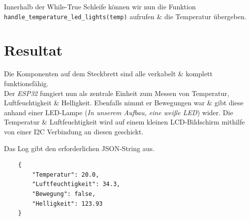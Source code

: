 \documentclass[9pt,a4paper]{report}
\begin{document}
	Innerhalb der While-True Schleife können wir nun die Funktion \\ \texttt{handle\_temperature\_led\_lights(temp)} aufrufen \& die Temperatur übergeben.
	
	
	\part{Resultat}
	Die Komponenten auf dem Steckbrett sind alle verkabelt \& komplett funktionsfähig.\\
	
	Der \textit{ESP32} fungiert nun als zentrale Einheit zum Messen von Temperatur, Luftfeuchtigkeit \& Helligkeit. Ebenfalls nimmt er Bewegungen war \& gibt diese anhand einer LED-Lampe (\textit{In unserem Aufbau, eine weiße LED}) wider. Die Temperatur \& Luftfeuchtigkeit wird auf einem kleinen LCD-Bildschirm mithilfe von einer I2C Verbindung an diesen geschickt.
	
	Das Log gibt den erforderlichen JSON-String aus.
	\begin{lstlisting}
	{
		"Temperatur": 20.0,
		"Luftfeuchtigkeit": 34.3,
		"Bewegung": false,
		"Helligkeit": 123.93
	}
	\end{lstlisting}
	
	
\end{document}
